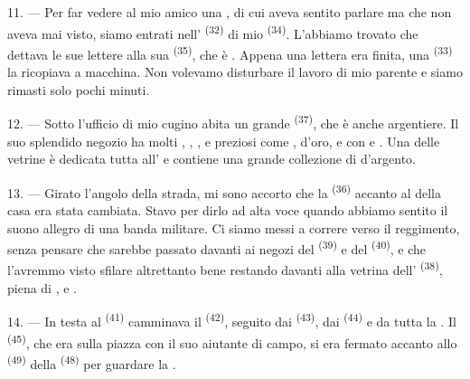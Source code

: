 \VUsaut{3.0mm}

11. --- Per far vedere al mio amico una , di cui aveva
sentito parlare ma che non aveva mai visto, siamo entrati nell'
\textsuperscript{(32)} di mio  \textsuperscript{(34)}. L'abbiamo trovato
che dettava le sue lettere alla sua  \textsuperscript{(35)}, che è
. Appena una lettera era finita, una 
\textsuperscript{(33)} la ricopiava a macchina. Non volevamo disturbare il lavoro di
mio parente e siamo rimasti solo pochi minuti.

12. --- Sotto l'ufficio di mio cugino abita un grande
 \textsuperscript{(37)}, che è anche argentiere. Il
suo splendido negozio ha molti , ,
,  e  preziosi come
,  d'oro,  e
 con  e . Una delle vetrine è
dedicata tutta all' e contiene una grande collezione di
 d'argento.

13. --- Girato l'angolo della strada, mi sono accorto che la 
\textsuperscript{(36)} accanto al  della casa era stata cambiata. Stavo
per dirlo ad alta voce quando abbiamo sentito il suono allegro di una banda militare.
Ci siamo messi a correre verso il reggimento, senza pensare che sarebbe passato davanti
ai negozi del  \textsuperscript{(39)} e del 
\textsuperscript{(40)}, e che l'avremmo visto sfilare altrettanto bene restando davanti
alla vetrina dell' \textsuperscript{(38)}, piena di ,
 e .

\VUsaut{3.0mm}

14. --- In testa al  \textsuperscript{(41)} camminava il
 \textsuperscript{(42)}, seguito dai 
\textsuperscript{(43)}, dai  \textsuperscript{(44)} e da tutta la
. Il  \textsuperscript{(45)}, che era sulla piazza con
il suo aiutante di campo, si era fermato accanto allo 
\textsuperscript{(49)} della  \textsuperscript{(48)} per guardare la
.


